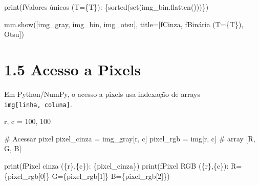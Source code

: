 \documentclass[
  portuguese,
  letterpaper,
  openany,
  oneside,
  12pt,
  a4paper]{book}
\newenvironment{Shaded}{\begin{snugshade}}{\end{snugshade}}
\newcommand{\BuiltInTok}[1]{\textcolor[rgb]{0.00,0.23,0.31}{#1}}
\newcommand{\CommentTok}[1]{\textcolor[rgb]{0.37,0.37,0.37}{#1}}
\newcommand{\DecValTok}[1]{\textcolor[rgb]{0.68,0.00,0.00}{#1}}
\newcommand{\NormalTok}[1]{\textcolor[rgb]{0.00,0.23,0.31}{#1}}
\newcommand{\OperatorTok}[1]{\textcolor[rgb]{0.37,0.37,0.37}{#1}}
\newcommand{\SpecialCharTok}[1]{\textcolor[rgb]{0.37,0.37,0.37}{#1}}
\newcommand{\SpecialStringTok}[1]{\textcolor[rgb]{0.13,0.47,0.30}{#1}}
\newcommand{\StringTok}[1]{\textcolor[rgb]{0.13,0.47,0.30}{#1}}
\begin{document}
\begin{tcolorbox}
\begin{Shaded}
\begin{Highlighting}[]
\BuiltInTok{print}\NormalTok{(}\SpecialStringTok{f\textquotesingle{}Valores únicos (T=}\SpecialCharTok{\{}\NormalTok{T}\SpecialCharTok{\}}\SpecialStringTok{): }\SpecialCharTok{\{}\BuiltInTok{sorted}\NormalTok{(}\BuiltInTok{set}\NormalTok{(img\_bin.flatten()))}\SpecialCharTok{\}}\SpecialStringTok{\textquotesingle{}}\NormalTok{)}

\NormalTok{mm.show([img\_gray, img\_bin, img\_otsu],}
\NormalTok{        title}\OperatorTok{=}\NormalTok{[}\SpecialStringTok{f\textquotesingle{}Cinza\textquotesingle{}}\NormalTok{, }\SpecialStringTok{f\textquotesingle{}Binária (T=}\SpecialCharTok{\{}\NormalTok{T}\SpecialCharTok{\}}\SpecialStringTok{)\textquotesingle{}}\NormalTok{, }\StringTok{\textquotesingle{}Otsu\textquotesingle{}}\NormalTok{])}
\end{Highlighting}
\end{Shaded}

\section{1.5 Acesso a Pixels}\label{acesso-a-pixels-2}

Em Python/NumPy, o acesso a pixels usa indexação de arrays
\texttt{img{[}linha,\ coluna{]}}.

\begin{Shaded}
\begin{Highlighting}[]
\NormalTok{r, c }\OperatorTok{=} \DecValTok{100}\NormalTok{, }\DecValTok{100}

\CommentTok{\# Acessar pixel}
\NormalTok{pixel\_cinza }\OperatorTok{=}\NormalTok{ img\_gray[r, c]}
\NormalTok{pixel\_rgb   }\OperatorTok{=}\NormalTok{ img[r, c]       }\CommentTok{\# array [R, G, B]}

\BuiltInTok{print}\NormalTok{(}\SpecialStringTok{f\textquotesingle{}Pixel cinza (}\SpecialCharTok{\{}\NormalTok{r}\SpecialCharTok{\}}\SpecialStringTok{,}\SpecialCharTok{\{}\NormalTok{c}\SpecialCharTok{\}}\SpecialStringTok{): }\SpecialCharTok{\{}\NormalTok{pixel\_cinza}\SpecialCharTok{\}}\SpecialStringTok{\textquotesingle{}}\NormalTok{)}
\BuiltInTok{print}\NormalTok{(}\SpecialStringTok{f\textquotesingle{}Pixel RGB   (}\SpecialCharTok{\{}\NormalTok{r}\SpecialCharTok{\}}\SpecialStringTok{,}\SpecialCharTok{\{}\NormalTok{c}\SpecialCharTok{\}}\SpecialStringTok{): R=}\SpecialCharTok{\{}\NormalTok{pixel\_rgb[}\DecValTok{0}\NormalTok{]}\SpecialCharTok{\}}\SpecialStringTok{  G=}\SpecialCharTok{\{}\NormalTok{pixel\_rgb[}\DecValTok{1}\NormalTok{]}\SpecialCharTok{\}}\SpecialStringTok{  B=}\SpecialCharTok{\{}\NormalTok{pixel\_rgb[}\DecValTok{2}\NormalTok{]}\SpecialCharTok{\}}\SpecialStringTok{\textquotesingle{}}\NormalTok{)}


\end{Highlighting}
\end{Shaded}
\end{tcolorbox}
\end{document}
